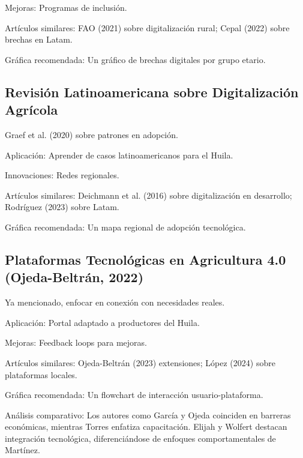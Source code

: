 Mejoras: Programas de inclusión.

Artículos similares: FAO (2021) sobre digitalización rural; Cepal (2022) sobre brechas en Latam.

Gráfica recomendada: Un gráfico de brechas digitales por grupo etario.

\subsection{Revisión Latinoamericana sobre Digitalización Agrícola}

Graef et al. (2020) sobre patrones en adopción.

Aplicación: Aprender de casos latinoamericanos para el Huila.

Innovaciones: Redes regionales.

Artículos similares: Deichmann et al. (2016) sobre digitalización en desarrollo; Rodríguez (2023) sobre Latam.

Gráfica recomendada: Un mapa regional de adopción tecnológica.

\subsection{Plataformas Tecnológicas en Agricultura 4.0 (Ojeda-Beltrán, 2022)}

Ya mencionado, enfocar en conexión con necesidades reales.

Aplicación: Portal adaptado a productores del Huila.

Mejoras: Feedback loops para mejoras.

Artículos similares: Ojeda-Beltrán (2023) extensiones; López (2024) sobre plataformas locales.

Gráfica recomendada: Un flowchart de interacción usuario-plataforma.

Análisis comparativo: Los autores como García y Ojeda coinciden en barreras económicas, mientras Torres enfatiza capacitación. Elijah y Wolfert destacan integración tecnológica, diferenciándose de enfoques comportamentales de Martínez.